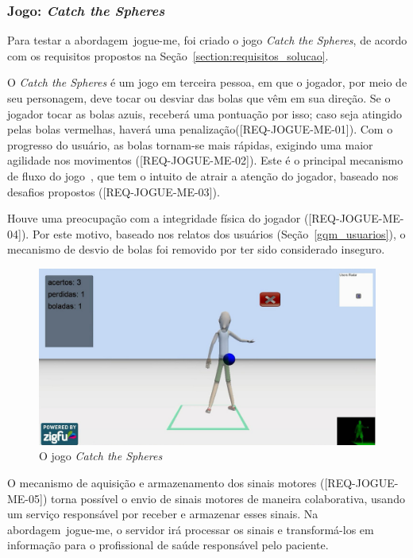 \subsubsection{Jogo: \textit{Catch the Spheres}}\label{jogo_catch}
Para testar a abordagem~\ac{jogue-me}, foi criado o jogo \textit{Catch the Spheres}, de acordo com os requisitos propostos na Seção~\ref{section:requisitos_solucao}.  

O \textit{Catch the Spheres} é um jogo em terceira pessoa, em que o jogador, por meio de seu personagem, deve tocar ou desviar das bolas que vêm em sua direção. Se o jogador tocar as bolas azuis, receberá uma pontuação por isso; caso seja atingido pelas bolas vermelhas, haverá uma penalização([REQ-JOGUE-ME-01]). Com o progresso do usuário, as bolas tornam-se mais rápidas, exigindo uma maior agilidade nos movimentos ([REQ-JOGUE-ME-02]). Este é o principal mecanismo de fluxo do jogo~\cite{sweetser2005-gameflow}, que tem o intuito de atrair a atenção do jogador, baseado nos desafios propostos ([REQ-JOGUE-ME-03]). 

Houve uma preocupação com a integridade física do jogador ([REQ-JOGUE-ME-04]). Por este motivo, baseado nos relatos dos usuários (Seção~\ref{gqm_usuarios}), o mecanismo de desvio de bolas foi removido por ter sido considerado inseguro.

\begin{figure}[!h]
     \centering
     \includegraphics[width=.8\textwidth]{./img/catch-the-spheres.png}
     \caption{O jogo \emph{Catch the Spheres}}
     \label{img:catch}
\end{figure}

O mecanismo de aquisição e armazenamento dos sinais motores ([REQ-JOGUE-ME-05]) torna possível o envio de sinais motores de maneira colaborativa, usando um serviço responsável por receber e armazenar esses sinais. Na abordagem~\ac{jogue-me}, o servidor irá processar os sinais e transformá-los em informação para o profissional de saúde responsável pelo paciente.

